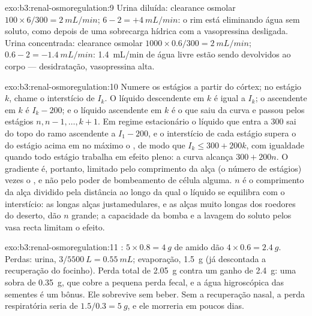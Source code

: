 \begin{solution}{exo:b3:renal-osmoregulation:9}
Urina diluída: clearance osmolar $100\times 6/300 = \qty{2}{mL/min}$;
 $6 - 2 = +\qty{4}{mL/min}$: o rim está
eliminando água sem soluto, como depois de uma sobrecarga hídrica com a
vasopressina desligada. Urina concentrada: clearance osmolar $1000\times 0.6/300 =
\qty{2}{mL/min}$;  $0.6 - 2 = -\qty{1.4}{mL/min}$: \qty{1.4}{mL/min} de água livre estão sendo
devolvidos ao corpo --- desidratação, vasopressina alta.
\end{solution}

\begin{solution}{exo:b3:renal-osmoregulation:10}
Numere os estágios a partir do córtex; no estágio $k$, chame o
interstício de $I_{k}$. O líquido descendente em $k$ é igual a $I_{k}$; o
ascendente em $k$ é $I_{k} - 200$; e o líquido ascendente em $k$ é o que
saiu da curva e passou pelos estágios $n, n-1, \dots, k+1$. Em regime
estacionário o líquido que entra a \qty{300}{} sai do topo do ramo
ascendente a $I_{1} - 200$, e o interstício de cada estágio supera o do
estágio acima em no máximo o , de modo que $I_{k} \le 300 + 200k$, com igualdade quando todo estágio trabalha em efeito pleno: a
curva alcança $300 + 200n$. O gradiente é, portanto, limitado pelo
comprimento da alça (o número de estágios) vezes o , e não
pelo poder de bombeamento de célula alguma. $n$ é o comprimento da alça
dividido pela distância ao longo da qual o líquido se equilibra com o
interstício: as longas alças justamedulares, e as alças muito longas dos
roedores do deserto, dão $n$ grande; a capacidade da bomba e a lavagem
do soluto pelos vasa recta limitam o efeito.
\end{solution}

\begin{solution}{exo:b3:renal-osmoregulation:11}
: $5\times 0.8 = \qty{4}{g}$ de amido dão $4\times 0.6
= \qty{2.4}{g}$. Perdas: urina, $3/5500\ \unit{L} = \qty{0.55}{mL}$;
evaporação, \qty{1.5}{g} (já descontada a recuperação do focinho). Perda
total de \qty{2.05}{g} contra um ganho de \qty{2.4}{g}: uma sobra de
\qty{0.35}{g}, que cobre a pequena perda fecal, e a água higroscópica
das sementes é um bônus. Ele sobrevive sem beber. Sem a recuperação
nasal, a perda respiratória seria de $1.5/0.3 = \qty{5}{g}$, e ele
morreria em poucos dias.
\end{solution}

